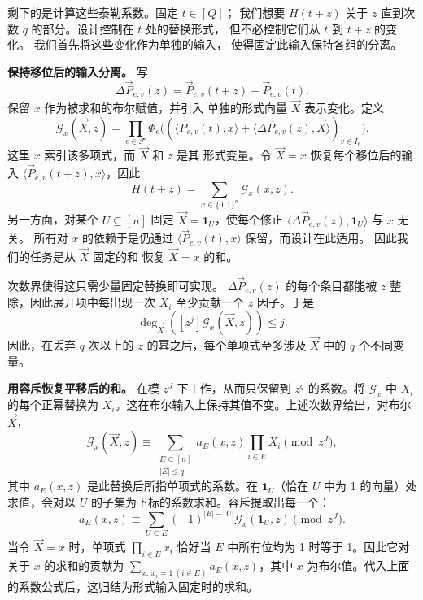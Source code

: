\documentclass[11pt,reqno]{amsart}
\numberwithin{equation}{section}
\theoremstyle{definition}\newtheorem{definition}[theorem]{定义}
\theoremstyle{remark}\newtheorem{remark}[theorem]{注}
\renewcommand{\le}{\leqslant}
\begin{document}
剩下的是计算这些泰勒系数。固定 $t\in[Q]$；
我们想要 $H(t+z)$ 关于 $z$ 直到次数 $q$ 的部分。设计控制在 $t$ 处的替换形式，
但不必控制它们从 $t$ 到 $t+z$ 的变化。
我们首先将这些变化作为单独的输入，
使得固定此输入保持各组的分离。

\smallskip\noindent
\textbf{保持移位后的输入分离。}
写
\[
 \Delta\vec P_{e,v}(z)=\vec P_{e,v}(t+z)-\vec P_{e,v}(t).
\]
保留 $x$ 作为被求和的布尔赋值，并引入
单独的形式向量 $\vec X$ 表示变化。定义
\begin{equation}\label{eq:outline-taylor-product}
 \mathcal G_x(\vec X,z)=
 \prod_{e\in\mathcal F}\Phi_e\bigl(
       (\langle\vec P_{e,v}(t),x\rangle+
        \langle\Delta\vec P_{e,v}(z),\vec X\rangle)_{v\in I_e}\bigr).
\end{equation}
这里 $x$ 索引该多项式，而 $\vec X$ 和 $z$ 是其
形式变量。令 $\vec X=x$ 恢复每个移位后的输入
$\langle\vec P_{e,v}(t+z),x\rangle$，因此
\[
 H(t+z)=\sum_{x\in\{0,1\}^n}\mathcal G_x(x,z).
\]
另一方面，对某个
$U\subseteq[n]$ 固定 $\vec X=\mathbf1_U$，使每个修正
$\langle\Delta\vec P_{e,v}(z),\mathbf1_U\rangle$ 与 $x$ 无关。
所有对 $x$ 的依赖于是仍通过
$\langle\vec P_{e,v}(t),x\rangle$ 保留，而设计在此适用。
因此我们的任务是从 $\vec X$ 固定的和
恢复 $\vec X=x$ 的和。

次数界使得这只需少量固定替换即可实现。
$\Delta\vec P_{e,v}(z)$ 的每个条目都能被 $z$ 整除，因此展开项中每出现一次 $X_i$ 至少贡献一个 $z$ 因子。于是
\[
 \deg_{\vec X}([z^j]\mathcal G_x(\vec X,z))\le j.
\]
因此，在丢弃 $q$ 次以上的 $z$ 的幂之后，每个单项式至多涉及 $\vec X$ 中的 $q$ 个不同变量。

\smallskip\noindent
\textbf{用容斥恢复平移后的和。}
在模 $z^J$ 下工作，从而只保留到 $z^q$ 的系数。将 $\mathcal G_x$ 中 $X_i$ 的每个正幂替换为 $X_i$。这在布尔输入上保持其值不变。上述次数界给出，对布尔 $\vec X$，
\[
 \mathcal G_x(\vec X,z)\equiv
 \sum_{\substack{E\subseteq[n]\\|E|\le q}}
       a_E(x,z)\prod_{i\in E}X_i\pmod{z^J},
\]
其中 $a_E(x,z)$ 是此替换后所指单项式的系数。在 $\mathbf1_U$（恰在 $U$ 中为 1 的向量）处求值，会对以 $U$ 的子集为下标的系数求和。容斥提取出每一个：
\[
 a_E(x,z)\equiv
 \sum_{U\subseteq E}(-1)^{|E|-|U|}
                 \mathcal G_x(\mathbf1_U,z)\pmod{z^J}.
\]
当令 $\vec X=x$ 时，单项式 $\prod_{i\in E}x_i$ 恰好当 $E$ 中所有位均为 1 时等于 1。因此它对关于 $x$ 的求和的贡献为 $\sum_{x:\,x_i=1\ (i\in E)}a_E(x,z)$，其中 $x$ 为布尔值。代入上面的系数公式后，这归结为形式输入固定时的求和。
\end{document}
